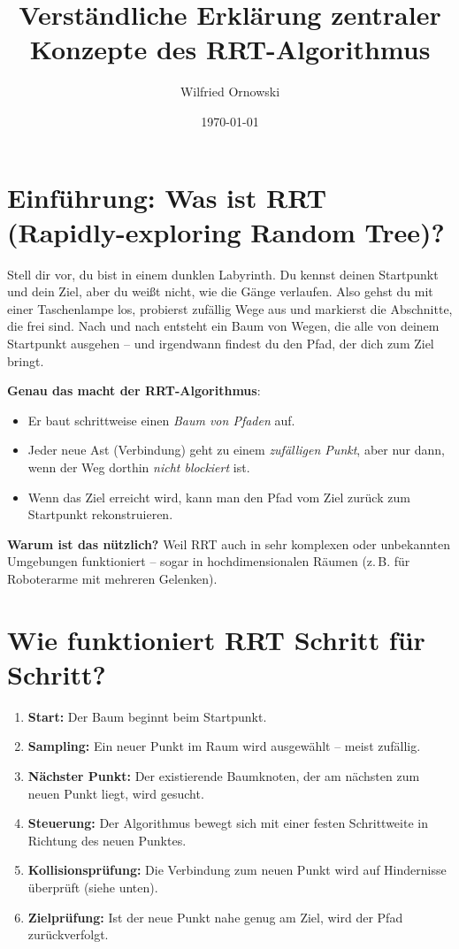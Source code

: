 \documentclass[12pt]{article}
\title{Verständliche Erklärung zentraler Konzepte des RRT-Algorithmus}
\author{Wilfried Ornowski}
\date{\today}
\begin{document}
\maketitle

\section*{Einführung: Was ist RRT (Rapidly-exploring Random Tree)?}

Stell dir vor, du bist in einem dunklen Labyrinth. Du kennst deinen Startpunkt und dein Ziel, aber du weißt nicht, wie die Gänge verlaufen. Also gehst du mit einer Taschenlampe los, probierst zufällig Wege aus und markierst die Abschnitte, die frei sind. Nach und nach entsteht ein Baum von Wegen, die alle von deinem Startpunkt ausgehen – und irgendwann findest du den Pfad, der dich zum Ziel bringt.

\bigskip
\noindent
\textbf{Genau das macht der RRT-Algorithmus}:
\begin{itemize}
    \item Er baut schrittweise einen \emph{Baum von Pfaden} auf.
    \item Jeder neue Ast (Verbindung) geht zu einem \emph{zufälligen Punkt}, aber nur dann, wenn der Weg dorthin \emph{nicht blockiert} ist.
    \item Wenn das Ziel erreicht wird, kann man den Pfad vom Ziel zurück zum Startpunkt rekonstruieren.
\end{itemize}

\bigskip
\noindent
\textbf{Warum ist das nützlich?} Weil RRT auch in sehr komplexen oder unbekannten Umgebungen funktioniert – sogar in hochdimensionalen Räumen (z.\,B. für Roboterarme mit mehreren Gelenken).

\section*{Wie funktioniert RRT Schritt für Schritt?}

\begin{enumerate}
    \item \textbf{Start:} Der Baum beginnt beim Startpunkt.
    \item \textbf{Sampling:} Ein neuer Punkt im Raum wird ausgewählt – meist zufällig.
    \item \textbf{Nächster Punkt:} Der existierende Baumknoten, der am nächsten zum neuen Punkt liegt, wird gesucht.
    \item \textbf{Steuerung:} Der Algorithmus bewegt sich mit einer festen Schrittweite in Richtung des neuen Punktes.
    \item \textbf{Kollisionsprüfung:} Die Verbindung zum neuen Punkt wird auf Hindernisse überprüft (siehe unten).
    \item \textbf{Zielprüfung:} Ist der neue Punkt nahe genug am Ziel, wird der Pfad zurückverfolgt.
\end{enumerate}
\end{document}
